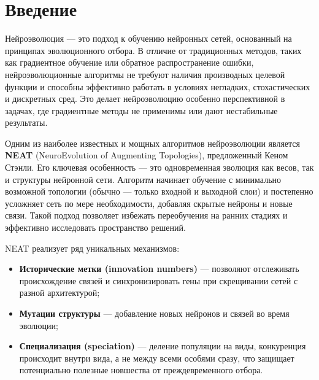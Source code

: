 \documentclass[a4paper,12pt]{article}
\begin{document}
\tableofcontents
\setcounter{page}{2}
\newpage

\titleformat{\section}{\normalfont\bfseries}{\thesection}{1em}{}
\titleformat{\subsection}{\normalfont\bfseries}{\thesubsection}{1em}{}
\setlength{\parindent}{15mm}
\onehalfspacing

\section{Введение}
Нейроэволюция — это подход к обучению нейронных сетей, основанный на принципах эволюционного отбора. В отличие от традиционных методов, таких как градиентное обучение или обратное распространение ошибки, нейроэволюционные алгоритмы не требуют наличия производных целевой функции и способны эффективно работать в условиях негладких, стохастических и дискретных сред. Это делает нейроэволюцию особенно перспективной в задачах, где градиентные методы не применимы или дают нестабильные результаты.

Одним из наиболее известных и мощных алгоритмов нейроэволюции является \textbf{NEAT} (NeuroEvolution of Augmenting Topologies), предложенный Кеном Стэнли. Его ключевая особенность — это одновременная эволюция как весов, так и структуры нейронной сети. Алгоритм начинает обучение с минимально возможной топологии (обычно — только входной и выходной слои) и постепенно усложняет сеть по мере необходимости, добавляя скрытые нейроны и новые связи. Такой подход позволяет избежать переобучения на ранних стадиях и эффективно исследовать пространство решений.

NEAT реализует ряд уникальных механизмов:
\begin{itemize}
  \item \textbf{Исторические метки (innovation numbers)} — позволяют отслеживать происхождение связей и синхронизировать гены при скрещивании сетей с разной архитектурой;
  \item \textbf{Мутации структуры} — добавление новых нейронов и связей во время эволюции;
  \item \textbf{Специализация (speciation)} — деление популяции на виды, конкуренция происходит внутри вида, а не между всеми особями сразу, что защищает потенциально полезные новшества от преждевременного отбора.
\end{itemize}
\end{document}
